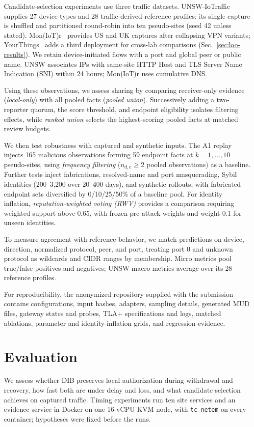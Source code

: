 \documentclass[journal]{IEEEtran}
\theoremstyle{definition}
\begin{document}
Candidate-selection experiments use three traffic datasets. UNSW-IoTraffic~\cite{sivanathan2019classifying} supplies 27 device types and 28 traffic-derived reference profiles; its single capture is shuffled and partitioned round-robin into ten pseudo-sites (seed 42 unless stated). Mon(IoT)r~\cite{moniotr} provides US and UK captures after collapsing VPN variants; YourThings~\cite{alrawi2019yourthings} adds a third deployment for cross-lab comparisons (Sec.~\ref{sec:loo-results}). We retain device-initiated flows with a port and global peer or public name. UNSW associates IPs with same-site HTTP Host and TLS Server Name Indication (SNI) within 24 hours; Mon(IoT)r uses cumulative DNS.

Using these observations, we assess sharing by comparing receiver-only evidence (\emph{local-only}) with all pooled facts (\emph{pooled union}). Successively adding a two-reporter quorum, the score threshold, and endpoint eligibility isolates filtering effects, while \emph{ranked union} selects the highest-scoring pooled facts at matched review budgets.

We then test robustness with captured and synthetic inputs. The A1 replay injects 165 malicious observations forming 59 endpoint facts at $k=1,\ldots,10$ pseudo-sites, using \emph{frequency filtering} ($n_{d,e}\ge2$ pooled observations) as a baseline. Further tests inject fabrications, resolved-name and port masquerading, Sybil identities (200--3,200 over 20--400 days), and synthetic rollouts, with fabricated endpoint sets diversified by 0/10/25/50\% of a baseline pool. For identity inflation, \emph{reputation-weighted voting (RWV)} provides a comparison requiring weighted support above 0.65, with frozen pre-attack weights and weight 0.1 for unseen identities.

To measure agreement with reference behavior, we match predictions on device, direction, normalized protocol, peer, and port, treating port 0 and unknown protocol as wildcards and CIDR ranges by membership. Micro metrics pool true/false positives and negatives; UNSW macro metrics average over its 28 reference profiles.



For reproducibility, the anonymized repository supplied with the submission contains configurations, input hashes, adapters, sampling details, generated MUD files, gateway states and probes, TLA+ specifications and logs, matched ablations, parameter and identity-inflation grids, and regression evidence. 

\section{Evaluation}
\label{sec:eval}
We assess whether DIB preserves local authorization during withdrawal and recovery, how fast both are under delay and loss, and what candidate selection achieves on captured traffic. Timing experiments run ten site services and an evidence service in Docker on one 16-vCPU KVM node, with \texttt{tc netem} on every container; hypotheses were fixed before the runs.
\end{document}
